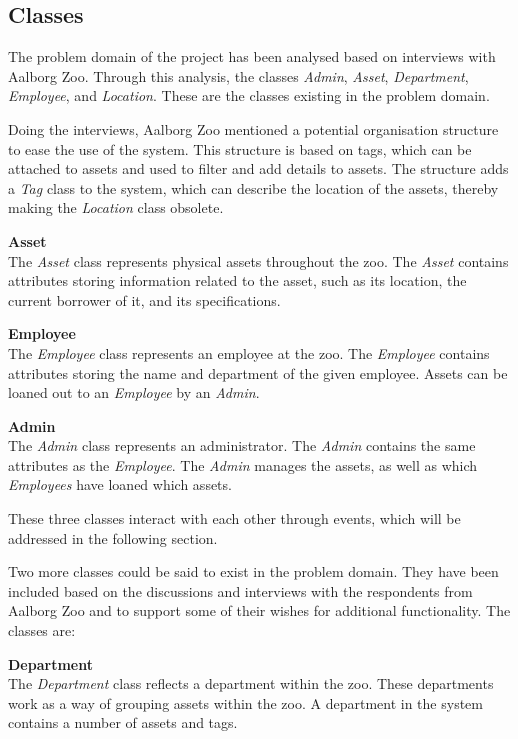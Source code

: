 \subsection{Classes}

The problem domain of the project has been analysed based on interviews with Aalborg Zoo. Through this analysis, the classes \textit{Admin}, \textit{Asset}, \textit{Department}, \textit{Employee}, and \textit{Location}. These are the classes existing in the problem domain.
\par
Doing the interviews, Aalborg Zoo mentioned a potential organisation structure to ease the use of the system. This structure is based on tags, which can be attached to assets and used to filter and add details to assets. The structure adds a \textit{Tag} class to the system, which can describe the location of the assets, thereby making the \textit{Location} class obsolete.

\textbf{Asset}\\
The \textit{Asset} class represents physical assets throughout the zoo. The \textit{Asset} contains attributes storing information related to the asset, such as its location, the current borrower of it, and its specifications.
\par

\textbf{Employee}\\
The \textit{Employee} class represents an employee at the zoo. The \textit{Employee} contains attributes storing the name and department of the given employee. Assets can be loaned out to an \textit{Employee} by an \textit{Admin}.
\par

\textbf{Admin}\\
The \textit{Admin} class represents an administrator. The \textit{Admin} contains the same attributes as the \textit{Employee}. The \textit{Admin} manages the assets, as well as which \textit{Employees} have loaned which assets.
\par
These three classes interact with each other through events, which will be addressed in the following section.
\par
Two more classes could be said to exist in the problem domain. They have been included based on the discussions and interviews with the respondents from Aalborg Zoo and to support some of their wishes for additional functionality. The classes are: 
\par
\textbf{Department}\\
The \textit{Department} class reflects a department within the zoo. These departments work as a way of grouping assets within the zoo. A department in the system contains a number of assets and tags.
\par

